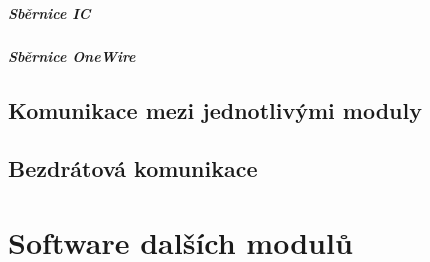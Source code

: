 \paragraph{Sběrnice IC}

\paragraph{Sběrnice OneWire}

\section{Komunikace mezi jednotlivými moduly}

\section{Bezdrátová komunikace}


\chapter{Software dalších modulů}
\label{chap:moduleSoftware}

\newpage